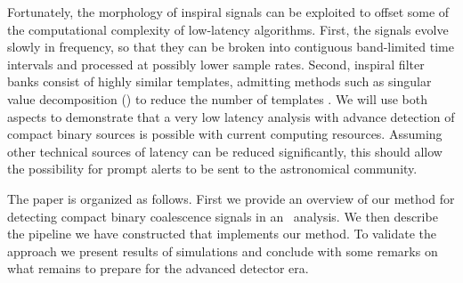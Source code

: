 Fortunately, the morphology of inspiral signals can be exploited to offset some
of the computational complexity of low-latency algorithms.  First, the signals
evolve slowly in frequency, so that they can be broken into contiguous
band-limited time intervals and processed at possibly lower sample rates.
Second, inspiral filter banks consist of highly similar templates, admitting
methods such as singular value decomposition (\SVD{}) to reduce the number of
templates \citep{Cannon:2010p10398}. We will use both aspects to demonstrate that a very
low latency analysis with advance detection of compact binary sources is
possible with current computing resources.  Assuming other technical sources of
latency can be reduced significantly, this should allow the possibility for
prompt alerts to be sent to the astronomical community.

The paper is organized as follows. First we provide an overview of our method
for detecting compact binary coalescence signals in an \earlywarning\ analysis.
We then describe the pipeline we have constructed that implements our method.
To validate the approach we present results of simulations and conclude with
some remarks on what remains to prepare for the advanced detector era.

